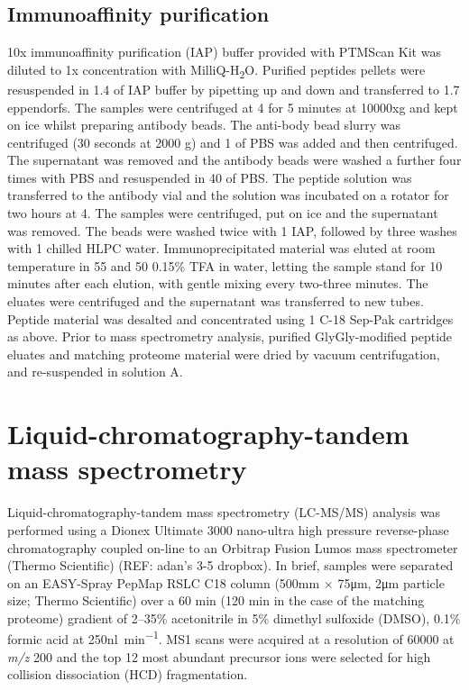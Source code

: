 \subsection{Immunoaffinity purification}
10x immunoaffinity purification (IAP) buffer provided with PTMScan Kit was diluted to 1x concentration with MilliQ-H\textsubscript{2}O.
Purified peptides pellets were resuspended in 1.4\ml{} of IAP buffer by pipetting up and down and transferred to 1.7\ml{} eppendorfs.
The samples were centrifuged at 4\C{} for 5 minutes at 10000xg and kept on ice whilst preparing antibody beads.
The anti-body bead slurry was centrifuged (30 seconds at 2000 g) and 1\ml{} of PBS was added and then centrifuged.
The supernatant was removed and the antibody beads were washed a further four times with PBS and resuspended in 40\ul{} of PBS.
The peptide solution was transferred to the antibody vial and the solution was incubated on a rotator for two hours at 4\C{}.
The samples were centrifuged, put on ice and the supernatant was removed.
The beads were washed twice with 1\ml{} IAP, followed by three washes with 1\ml{} chilled HLPC water.
Immunoprecipitated material was eluted at room temperature in 55\ul{} and 50\ul{} 0.15\% TFA in water, letting the sample stand for 10 minutes after each elution, with gentle mixing every two-three minutes.
The eluates were centrifuged and the supernatant was transferred to new tubes.
Peptide material was desalted and concentrated using 1\ml{} C-18 Sep-Pak cartridges as above.
Prior to mass spectrometry analysis, purified GlyGly-modified peptide eluates and matching proteome material were dried by vacuum centrifugation, and re-suspended in solution A.
%

\section{Liquid-chromatography-tandem mass spectrometry}
Liquid-chromatography-tandem mass spectrometry (LC-MS/MS) analysis was performed using a Dionex Ultimate 3000 nano-ultra high pressure reverse-phase chromatography coupled on-line to an Orbitrap Fusion Lumos mass spectrometer (Thermo Scientific) (REF: adan's 3-5 dropbox).
In brief, samples were separated on an EASY-Spray PepMap RSLC C18 column (500\si{\mm} × 75\si{\um}, 2\si{\um} particle size; Thermo Scientific) over a 60 min (120 min in the case of the matching proteome) gradient of 2–35\% acetonitrile in 5\% dimethyl sulfoxide (DMSO), 0.1\% formic acid at 250\si{\nano\litre\per\minute}.
MS1 scans were acquired at a resolution of 60000 at \textit{m/z} 200 and the top 12 most abundant precursor ions were selected for high collision dissociation (HCD) fragmentation.

